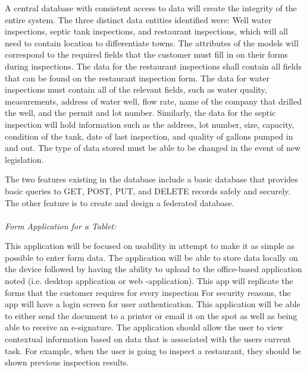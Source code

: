 \documentclass[twoside,letterpaper]{article}
\begin{document}
{A central database with consistent access to data will create the integrity of the entire system. The three distinct data entities identified were: Well water inspections, septic tank inspections, and restaurant inspections, which will all need to contain location to differentiate towns. The attributes of the models will correspond to the required fields that the customer must fill in on their forms during inspections. The data for the restaurant inspections shall contain all fields that can be found on the restaurant inspection form. The data for water inspections must contain all of the relevant fields, such as water quality, measurements, address of water well, flow rate, name of the company that drilled the well, and the permit and lot number. Similarly, the data for the septic inspection will hold information such as the address, lot number, size, capacity, condition of the tank, date of last inspection, and quality of gallons pumped in and out.  The type of data stored must be able to be changed in the event of new legislation.
\newline

The two features existing in the database include a basic database that provides basic queries to GET, POST, PUT, and DELETE records safely and securely. The other feature is to create and design a federated database.
\\  \\
\textit{Form Application for a Tablet:}
\newline

This application will be focused on usability in attempt to make it as simple as possible to enter form data. The application will be able to store data locally on the device followed by having the ability to upload to the office-based application noted (i.e. desktop application or web -application). This app will replicate the forms that the customer requires for every inspection For security reasons, the app will have a login screen for user authentication. This application will be able to either send the document to a printer or email it on the spot as well as being able to receive an e-signature. The application should allow the user to view contextual information based on data that is associated with the users current task. For example, when the user is going to inspect a restaurant, they should be shown previous inspection results. 
\newline

}
\end{document}

